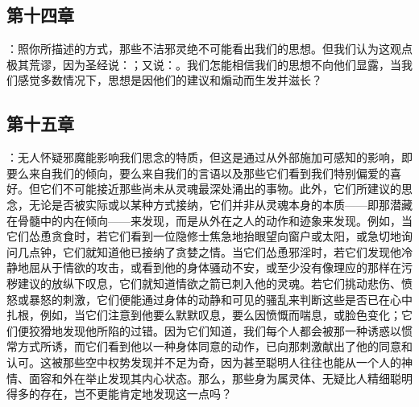 
\subsection{第十四章}

\par

：照你所描述的方式，那些不洁邪灵绝不可能看出我们的思想。但我们认为这观点极其荒谬，因为圣经说：；又说：。我们怎能相信我们的思想不向他们显露，当我们感觉多数情况下，思想是因他们的建议和煽动而生发并滋长？\par


\subsection{第十五章}

\par

：无人怀疑邪魔能影响我们思念的特质，但这是通过从外部施加可感知的影响，即要么来自我们的倾向，要么来自我们的言语以及那些它们看到我们特别偏爱的喜好。但它们不可能接近那些尚未从灵魂最深处涌出的事物。此外，它们所建议的思念，无论是否被实际或以某种方式接纳，它们并非从灵魂本身的本质——即那潜藏在骨髓中的内在倾向——来发现，而是从外在之人的动作和迹象来发现。例如，当它们怂恿贪食时，若它们看到一位隐修士焦急地抬眼望向窗户或太阳，或急切地询问几点钟，它们就知道他已接纳了贪婪之情。当它们怂恿邪淫时，若它们发现他冷静地屈从于情欲的攻击，或看到他的身体骚动不安，或至少没有像理应的那样在污秽建议的放纵下叹息，它们就知道情欲之箭已刺入他的灵魂。若它们挑动悲伤、愤怒或暴怒的刺激，它们便能通过身体的动静和可见的骚乱来判断这些是否已在心中扎根，例如，当它们注意到他要么默默叹息，要么因愤慨而喘息，或脸色变化；它们便狡猾地发现他所陷的过错。因为它们知道，我们每个人都会被那一种诱惑以惯常方式所诱，而它们看到他以一种身体同意的动作，已向那刺激献出了他的同意和认可。这被那些空中权势发现并不足为奇，因为甚至聪明人往往也能从一个人的神情、面容和外在举止发现其内心状态。那么，那些身为属灵体、无疑比人精细聪明得多的存在，岂不更能肯定地发现这一点吗？\par

